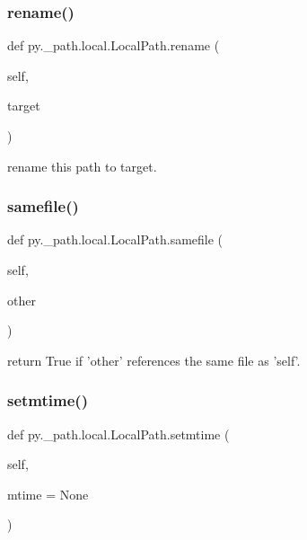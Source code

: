 \subsubsection{\texorpdfstring{rename()}{rename()}}
{\footnotesize\ttfamily def py.\+\_\+path.\+local.\+Local\+Path.\+rename (\begin{DoxyParamCaption}\item[{}]{self,  }\item[{}]{target }\end{DoxyParamCaption})}

\begin{DoxyVerb}rename this path to target. \end{DoxyVerb}
 \mbox{\label{classpy_1_1__path_1_1local_1_1_local_path_a07b02a65db0ae9b93e9611097e5e31d2}} 
\subsubsection{\texorpdfstring{samefile()}{samefile()}}
{\footnotesize\ttfamily def py.\+\_\+path.\+local.\+Local\+Path.\+samefile (\begin{DoxyParamCaption}\item[{}]{self,  }\item[{}]{other }\end{DoxyParamCaption})}

\begin{DoxyVerb}return True if 'other' references the same file as 'self'.
\end{DoxyVerb}
 \mbox{\label{classpy_1_1__path_1_1local_1_1_local_path_adb999b83d7a153a04fe319f2aa15dea4}} 
\subsubsection{\texorpdfstring{setmtime()}{setmtime()}}
{\footnotesize\ttfamily def py.\+\_\+path.\+local.\+Local\+Path.\+setmtime (\begin{DoxyParamCaption}\item[{}]{self,  }\item[{}]{mtime = {\ttfamily None} }\end{DoxyParamCaption})}

